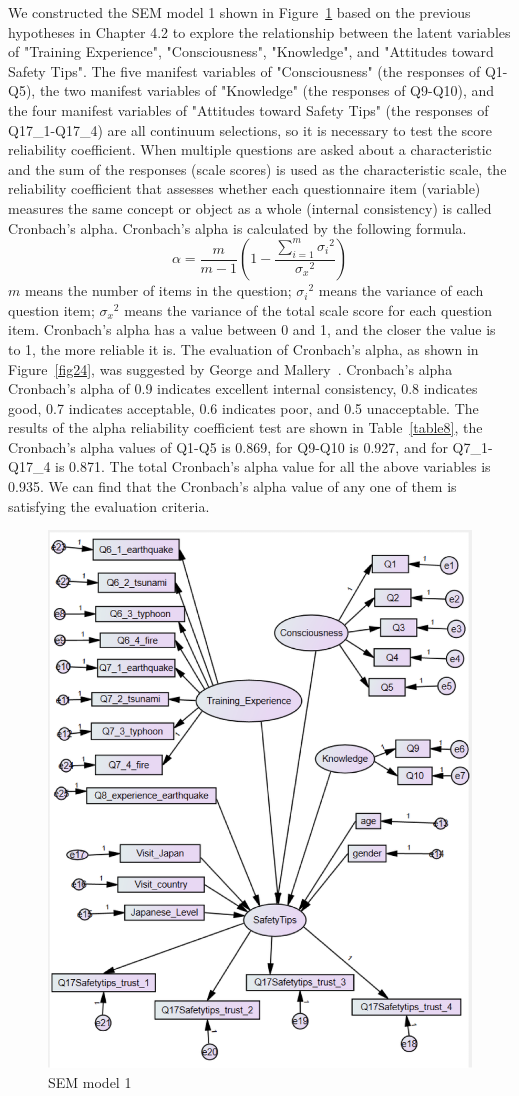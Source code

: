 We constructed the SEM model 1 shown in Figure~\ref{fig23} based on the previous hypotheses in Chapter 4.2 to explore the relationship between the latent variables of "Training Experience", "Consciousness", "Knowledge", and "Attitudes toward Safety Tips". The five manifest variables of "Consciousness" (the responses of Q1-Q5), the two manifest variables of "Knowledge" (the responses of Q9-Q10), and the four manifest variables of  "Attitudes toward Safety Tips" (the responses of Q17\_1-Q17\_4) are all continuum selections, so it is necessary to test the score reliability coefficient. When multiple questions are asked about a characteristic and the sum of the responses (scale scores) is used as the characteristic scale, the reliability coefficient that assesses whether each questionnaire item (variable) measures the same concept or object as a whole (internal consistency) is called Cronbach's alpha. Cronbach's alpha is calculated by the following formula. 
\begin{equation}
\alpha = \frac{m}{m-1} \left(1 - \frac{\displaystyle \sum_{i = 1}^m{{\sigma_i}^2}}{{\sigma_x}^2} \right)
\end{equation}
$m$ means the number of items in the question; ${\sigma_i}^2$ means the variance of each question item; ${\sigma_x}^2$ means the variance of the total scale score for each question item. Cronbach's alpha has a value between 0 and 1, and the closer the value is to 1, the more reliable it is. The evaluation of Cronbach's alpha, as shown in Figure~\ref{fig24}, was suggested by George and Mallery~\cite{ref1}. Cronbach's alpha  Cronbach's alpha of 0.9 indicates excellent internal consistency, 0.8 indicates good, 0.7 indicates acceptable, 0.6 indicates poor, and 0.5 unacceptable. The results of the alpha reliability coefficient test are shown in Table~\ref{table8}, the Cronbach's alpha values of Q1-Q5 is 0.869, for Q9-Q10 is 0.927, and for Q7\_1-Q17\_4 is 0.871. The total Cronbach's alpha value for all the above variables is 0.935. We can find that the Cronbach's alpha value of any one of them is satisfying the evaluation criteria.

\iffalse
\begin{figure}[h]
  \includegraphics[width=0.5\linewidth]{Figure/Figure23.jpg}
  \centering
  \caption{SEM model 1}
  \label{fig23}
\end{figure}

